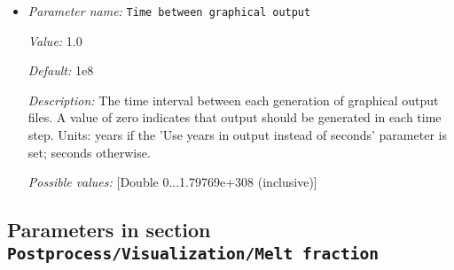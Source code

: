 \begin{itemize}
{\it Description:} The file format to be used for graphical output.


{\it Possible values:} [Selection none|dx|ucd|gnuplot|povray|eps|gmv|tecplot|tecplot_binary|vtk|vtu|hdf5|svg|deal.II intermediate ]
\item {\it Parameter name:} {\tt Time between graphical output}


{\it Value:} 1.0


{\it Default:} 1e8


{\it Description:} The time interval between each generation of graphical output files. A value of zero indicates that output should be generated in each time step. Units: years if the 'Use years in output instead of seconds' parameter is set; seconds otherwise.


{\it Possible values:} [Double 0...1.79769e+308 (inclusive)]
\end{itemize}



\subsection{Parameters in section \tt Postprocess/Visualization/Melt fraction}
\label{parameters:Postprocess/Visualization/Melt_20fraction}

